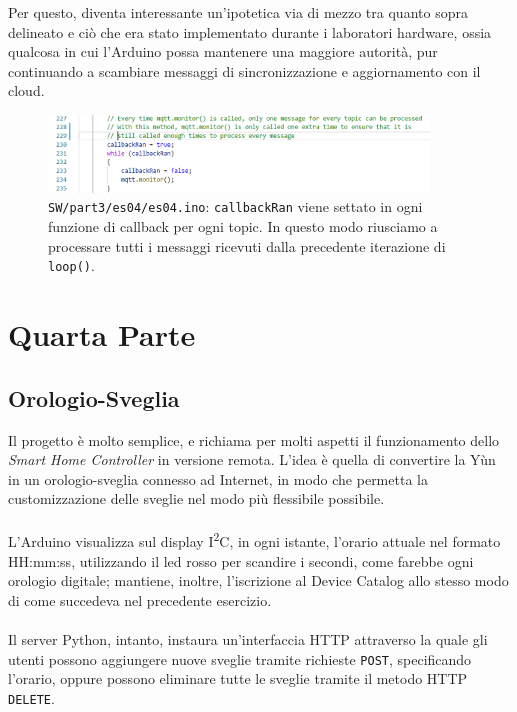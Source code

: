\documentclass[12pt,a4paper]{article}
\begin{document}
Per questo, diventa interessante un'ipotetica via di mezzo tra quanto sopra delineato e ciò che era stato implementato durante i laboratori hardware, ossia qualcosa in cui l'Arduino possa mantenere una maggiore autorità, pur continuando a scambiare messaggi di sincronizzazione e aggiornamento con il cloud.

\begin{figure}[htbp]
    \centering
    \includegraphics[width=0.9\textwidth]{mqtt_monitor.png}
    \caption*{\texttt{SW/part3/es04/es04.ino}: \texttt{callbackRan} viene settato in ogni funzione di callback per ogni topic. In questo modo riusciamo a processare tutti i messaggi ricevuti dalla precedente iterazione di \texttt{loop()}.}
    \label{fig:mqtt_monitor}
\end{figure}

\section{Quarta Parte}

\subsection{Orologio-Sveglia}

Il progetto è molto semplice, e richiama per molti aspetti il funzionamento dello \textit{Smart Home Controller} in versione remota. L'idea è quella di convertire la Yùn in un orologio-sveglia connesso ad Internet, in modo che permetta la customizzazione delle sveglie nel modo più flessibile possibile.
\\ \\
L'Arduino visualizza sul display I\textsuperscript{2}C, in ogni istante, l'orario attuale nel formato HH:mm:ss, utilizzando il led rosso per scandire i secondi, come farebbe ogni orologio digitale; mantiene, inoltre, l'iscrizione al Device Catalog allo stesso modo di come succedeva nel precedente esercizio.
\\ \\
Il server Python, intanto, instaura un'interfaccia HTTP attraverso la quale gli utenti possono aggiungere nuove sveglie tramite richieste \verb|POST|, specificando l'orario, oppure possono eliminare tutte le sveglie tramite il metodo HTTP \verb|DELETE|.
\end{document}
